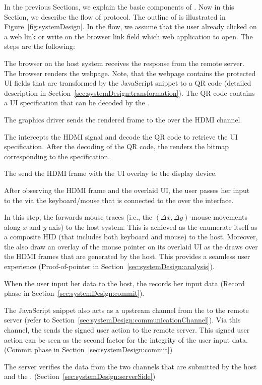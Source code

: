 In the previous Sections, we explain the basic components of \name. Now in this Section, we describe the flow of \name protocol. The outline of \name is illustrated in Figure~\ref{fig:systemDesign}. In the flow, we assume that the user already clicked on a web link or write on the browser link field which web application to open. The steps are the following:


\begin{mylist}
  \item[\one] The browser on the host system receives the response from the remote server. The browser renders the webpage. Note, that the webpage contains the protected UI fields that are transformed by the \name JavaScript snippet to a QR code (detailed description in Section~\ref{sec:systemDesign:transformation}). The QR code contains a UI specification that can be decoded by the \device.
  \item[\two] The graphics driver sends the rendered frame to the \device over the HDMI channel.
  \item[\three] The \device intercepts the HDMI signal and decode the QR code to retrieve the UI specification. After the decoding of the QR code, the \device renders the bitmap corresponding to the specification.
  \item[\four] The \device send the HDMI frame with the UI overlay to the display device.
  \item[\five] After observing the HDMI frame and the overlaid UI, the user passes her input to the \device via the keyboard/mouse that is connected to the \device over the \usb interface.
  \item[\six] In this step, the \device forwards mouse traces (i.e., the $(\Delta x,\Delta y)$-mouse movements along $x$ and $y$ axis) to the host system. This is achieved as the \device enumerate itself as a composite HID (that includes both keyboard and mouse) to the host. Moreover, the \device also draw an overlay of the mouse pointer on its overlaid UI as the \device draws over the HDMI frames that are generated by the host. This provides a seamless user experience (Proof-of-pointer in Section~\ref{sec:systemDesign:analysis}).
  \item[\seven] When the user input her data to the host, the \device records her input data (Record phase in Section~\ref{sec:systemDesign:commit}).
  \item[\eight] The \name JavaScript snippet also acts as a upstream channel from the \device to the remote server (refer to Section~\ref{sec:systemDesign:communicationChannel}). Via this channel, the \device sends the signed user action to the remote server. This signed user action can be seen as the second factor for the integrity of the user input data. (Commit phase in Section~\ref{sec:systemDesign:commit})
  \item [\nine] The server verifies the data from the two channels that are submitted by the host and the \device. (Section~\ref{sec:systemDesign:serverSide})
\end{mylist}



